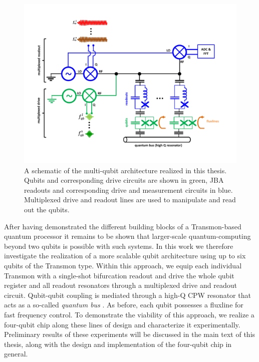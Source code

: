 \begin{figure}[ht!]
  \centering
	\includegraphics[width=1.\textwidth]{"./material/figures/scalable-architecture/scalable architecture - schematic"}
	\caption[Schematic of the multi-qubit architecture realized in this thesis]{A schematic of the multi-qubit architecture realized in this thesis. Qubits and corresponding drive circuits are shown in green, JBA readouts and corresponding drive and measurement circuits in blue. Multiplexed drive and readout lines are used to manipulate and read out the qubits.}
\end{figure}


After having demonstrated the different building blocks of a Transmon-based quantum processor it remains to be shown that larger-scale quantum-computing beyond two qubits is possible with such systems. In this work we therefore investigate the realization of a more scalable qubit architecture using up to six qubits of the Transmon type. Within this approach, we equip each individual Transmon with a single-shot bifurcation readout and drive the whole qubit register and all readout resonators through a multiplexed drive and readout circuit. Qubit-qubit coupling is mediated through a high-Q CPW resonator that acts as a so-called {\it quantum bus} \citep{majer_coupling_2007}. As before, each qubit possesses a fluxline for fast frequency control. To demonstrate the viability of this approach, we realize a four-qubit chip along these lines of design and characterize it experimentally. Preliminary results of these experiments will be discussed in the main text of this thesis, along with the design and implementation of the four-qubit chip in general.
